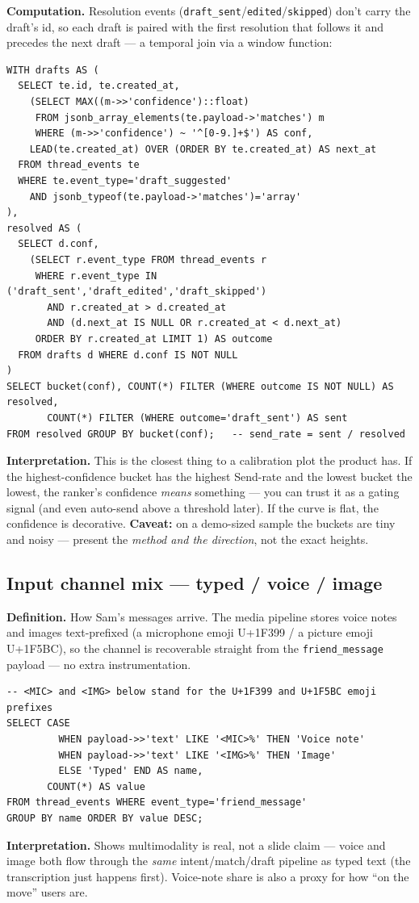 \documentclass[11pt, a4paper]{article}
\begin{document}
\textbf{Computation.} Resolution events (\texttt{draft\_sent}/\texttt{edited}/\texttt{skipped}) don't carry the draft's id, so each draft is paired with the first resolution that follows it and precedes the next draft --- a temporal join via a window function:
\begin{lstlisting}[style=sql]
WITH drafts AS (
  SELECT te.id, te.created_at,
    (SELECT MAX((m->>'confidence')::float)
     FROM jsonb_array_elements(te.payload->'matches') m
     WHERE (m->>'confidence') ~ '^[0-9.]+$') AS conf,
    LEAD(te.created_at) OVER (ORDER BY te.created_at) AS next_at
  FROM thread_events te
  WHERE te.event_type='draft_suggested'
    AND jsonb_typeof(te.payload->'matches')='array'
),
resolved AS (
  SELECT d.conf,
    (SELECT r.event_type FROM thread_events r
     WHERE r.event_type IN ('draft_sent','draft_edited','draft_skipped')
       AND r.created_at > d.created_at
       AND (d.next_at IS NULL OR r.created_at < d.next_at)
     ORDER BY r.created_at LIMIT 1) AS outcome
  FROM drafts d WHERE d.conf IS NOT NULL
)
SELECT bucket(conf), COUNT(*) FILTER (WHERE outcome IS NOT NULL) AS resolved,
       COUNT(*) FILTER (WHERE outcome='draft_sent') AS sent
FROM resolved GROUP BY bucket(conf);   -- send_rate = sent / resolved
\end{lstlisting}
\textbf{Interpretation.} This is the closest thing to a calibration plot the product has. If the highest-confidence bucket has the highest Send-rate and the lowest bucket the lowest, the ranker's confidence \emph{means} something --- you can trust it as a gating signal (and even auto-send above a threshold later). If the curve is flat, the confidence is decorative. \textbf{Caveat:} on a demo-sized sample the buckets are tiny and noisy --- present the \emph{method and the direction}, not the exact heights.

\subsection{Input channel mix --- typed / voice / image}
\textbf{Definition.} How Sam's messages arrive. The media pipeline stores voice notes and images text-prefixed (a microphone emoji U+1F399 / a picture emoji U+1F5BC), so the channel is recoverable straight from the \texttt{friend\_message} payload --- no extra instrumentation.
\begin{lstlisting}[style=sql]
-- <MIC> and <IMG> below stand for the U+1F399 and U+1F5BC emoji prefixes
SELECT CASE
         WHEN payload->>'text' LIKE '<MIC>%' THEN 'Voice note'
         WHEN payload->>'text' LIKE '<IMG>%' THEN 'Image'
         ELSE 'Typed' END AS name,
       COUNT(*) AS value
FROM thread_events WHERE event_type='friend_message'
GROUP BY name ORDER BY value DESC;
\end{lstlisting}
\textbf{Interpretation.} Shows multimodality is real, not a slide claim --- voice and image both flow through the \emph{same} intent/match/draft pipeline as typed text (the transcription just happens first). Voice-note share is also a proxy for how ``on the move'' users are.
\end{document}
